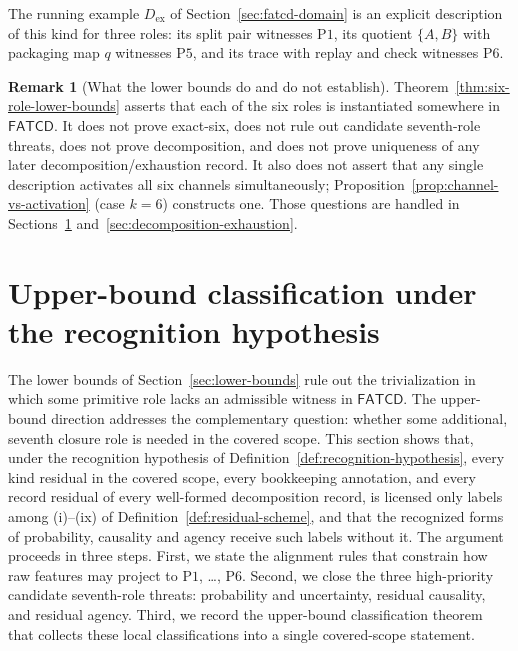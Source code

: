 \documentclass[11pt]{article}
\theoremstyle{definition}
\newtheorem{remark}[theorem]{Remark}
\newcommand{\FATCD}{\ensuremath{\mathsf{FATCD}}}
\newcommand{\Pone}{\ensuremath{\mathrm{P1}}}
\newcommand{\Pfive}{\ensuremath{\mathrm{P5}}}
\newcommand{\Psix}{\ensuremath{\mathrm{P6}}}
\begin{document}
The running example \(D_{\mathrm{ex}}\) of Section~\ref{sec:fatcd-domain}
is an explicit description of this kind for three roles: its split pair
witnesses \Pone{}, its quotient \(\{A,B\}\) with packaging map \(q\)
witnesses \Pfive{}, and its trace with replay and check witnesses \Psix{}.

\begin{remark}[What the lower bounds do and do not establish]\label{rem:lower-bounds-scope}
Theorem~\ref{thm:six-role-lower-bounds} asserts that each of the six
roles is instantiated somewhere in \FATCD{}. It does not prove
exact-six, does not rule out candidate seventh-role threats, does not
prove decomposition, and does not prove uniqueness of any later
decomposition/exhaustion record. It also does not assert that any
single description activates all six channels simultaneously;
Proposition~\ref{prop:channel-vs-activation} (case \(k=6\)) constructs one. Those
questions are handled in
Sections~\ref{sec:upper-bound-classification}
and~\ref{sec:decomposition-exhaustion}.
\end{remark}
 \section{Upper-bound classification under the recognition hypothesis}\label{sec:upper-bound-classification}



The lower bounds of Section~\ref{sec:lower-bounds} rule out the
trivialization in which some primitive role lacks an admissible
witness in \FATCD{}. The upper-bound direction addresses the
complementary question: whether some additional, seventh closure role
is needed in the covered scope. This section shows that, under the
recognition hypothesis of Definition~\ref{def:recognition-hypothesis}, every
kind residual in the covered scope, every bookkeeping annotation, and every record residual of every
well-formed decomposition record, is licensed only labels among (i)--(ix) of
Definition~\ref{def:residual-scheme}, and that the recognized forms of
probability, causality and agency receive such labels without it. The argument proceeds in three steps. First, we state the
alignment rules that constrain how raw features may project to
\Pone{}, \ldots, \Psix{}. Second, we close the three high-priority
candidate seventh-role threats: probability and uncertainty, residual
causality, and residual agency. Third, we record the upper-bound
classification theorem that collects these local classifications into
a single covered-scope statement.
\end{document}
